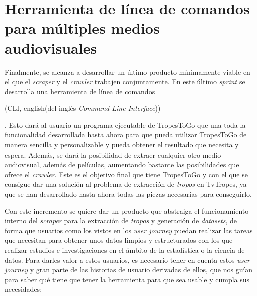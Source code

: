 \section{Herramienta de línea de comandos para múltiples medios audiovisuales}
Finalmente, se alcanza a desarrollar un último producto mínimamente viable en el
que el \textit{scraper} y el \textit{crawler} trabajen conjuntamente. En este
último \textit{sprint} se desarrolla una herramienta de línea de comandos
\begin{otherlanguage}{english}(CLI, {english}(del inglés \textit{Command Line
Interface}))\end{otherlanguage}. Esto dará al usuario un programa ejecutable de
TropesToGo que una toda la funcionalidad desarrollada hasta ahora para que pueda
utilizar TropesToGo de manera sencilla y personalizable y pueda obtener el
resultado que necesita y espera. Además, se dará la posibilidad de extraer
cualquier otro medio audiovisual, además de películas, aumentando bastante las
posibilidades que ofrece el \textit{crawler}. Este es el objetivo final que tiene
TropesToGo y con el que se consigue dar una solución al problema de extracción
de \textit{tropos} en TvTropes, ya que se han desarrollado hasta ahora todas las
piezas necesarias para conseguirlo.

Con este incremento se quiere dar un producto que abstraiga el funcionamiento
interno del \textit{scraper} para la extracción de \textit{tropos} y generación
de \textit{datasets}, de forma que usuarios como los vistos en los \textit{user
journey} puedan realizar las tareas que necesitan para obtener unos datos
limpios y estructurados con los que realizar estudios e investigaciones en el
ámbito de la estadística o la ciencia de datos. Para darles valor a estos
usuarios, es necesario tener en cuenta estos \textit{user journey} y gran parte
de las historias de usuario derivadas de ellos, que nos guían para saber qué
tiene que tener la herramienta para que sea usable y cumpla sus necesidades:

